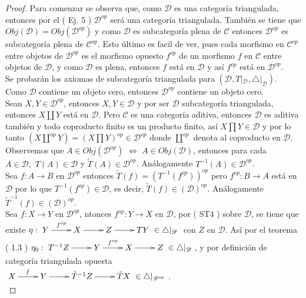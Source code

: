 \documentclass{article}
\begin{document}
\begin{enumerate}[label=\textbf{Ej \arabic*.}]
\begin{proof}
			 Para comenzar se observa que, como $\mathscr{D}$ es una categoría triangulada, entonces por el ( Ej. 5 )  $\mathscr{D}^{op}$ 
			será una categoría triangulada. También se tiene que $Obj(\mathscr{D})=Obj(\mathscr{D}^{op})$ y como $\mathscr{D}$ es subcategoría plena de 
			$\mathscr{C}$ entonces $\mathscr{D}^{op}$ es subcategoría plena de $\mathscr{C}^{op}$. Esto último es facil de ver, pues cada morfismo en 
			$\mathscr{C}^{op}$ entre objetos de $\mathscr{D}^{op}$ es el morfismo opuesto $f^{op}$ de un morfismo $f$ en $\mathscr{C}$ entre objetos de
			$\mathscr{D}$, y como $\mathscr{D}$ es plena, entonces $f$ está en $\mathscr{D}$ y así $f^{op}$ está en $\mathscr{D}^{op}$.\\
			
			Se probarán los axiomas de subcategoría triangulada para $(\mathscr{D},T|_\mathscr{D},\triangle|_\mathscr{D})$.\\
			
			 Como $\mathscr{D}$ contiene un objeto cero, entonces $\mathscr{D}^{op}$ contiene un objeto cero.\\
			
			 Sean $X,Y\in\mathscr{D}^{op}$, entonces $X,Y\in\mathscr{D}$ y por ser $\mathscr{D}$ subcategoría triangulada, entonces $X\coprod Y$ 
			está en $\mathscr{D}$. Pero $\mathscr{C}$ es una categoría aditiva, entonces $\mathscr{D}$ es aditiva también y todo coproducto finito es un producto 
			finito, así $X\prod Y\in \mathscr{D}$ y por lo tanto $\left(X\coprod^{op} Y\right)=\left(X\prod Y\right)^{op}\in \mathscr{D}^{op}$ donde 
			$\coprod^{op}$ denota al coproducto en $\mathscr{D}$.\\
			
			 Observemos que $ A\in Obj(\mathscr{D}^{op})\,\,\iff\,\, A\in Obj(\mathscr{D})$, entonces para cada $A\in \mathscr{D}, \,\,
			T(A)\in \mathscr{D}$ y $\tilde{T}(A)\in \mathscr{D}^{op}$. Análogamente $T^{-1}(A)\in \mathscr{D}^{op}$.\\
			
			Sea $f:A\to B$ en $\mathscr{D}^{op}$ entonces $\tilde{T}(f)=(T^{-1}(f^{op}))^{op}$ pero $f^{op}:B\to A$ está en $\mathscr{D}$ por lo que
			$T^{-1}(f^{op})\in \mathscr{D}$, es decir, $\tilde{T}(f)\in (\mathscr{D})^{op}$. Análogamente $\tilde{T}^{-1}(f)\in (\mathscr{D})^{op}$.\\
			
			 Sea $f:X\to Y$ en $\mathscr{D}^{op}$, ntonces $f^{op}:Y\to X$ en $\mathscr{D}$, por ( ST4 ) sobre $\mathscr{D}$, se tiene que
			existe $\eta:\xymatrix{Y\ar[r]^{f^{op}}&X\ar[r]&Z\ar[r]&TY\,\,\in \triangle|_{\mathscr{D}}}$ con $Z$ en $\mathscr{D}$. Así por el teorema ( 1.3 ) 
			$\eta_0:\xymatrix{T^{-1}Z\ar[r]&Y\ar[r]^{f^{op}}&X\ar[r]&Z\,\,\in \triangle|_{\mathscr{D}}}$, y por definición de categoría triangulada opuesta\\
			$\xymatrix{X\ar[r]^f&Y\ar[r]&\tilde{T}^{-1}Z\ar[r]&\tilde{T}X\,\,\in \triangle|_{\mathscr{D}^{op}}}$.\\
			

\end{proof}
\end{enumerate}
\end{document}
